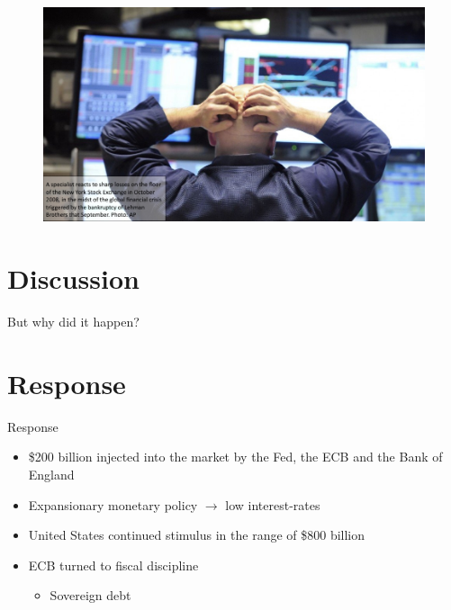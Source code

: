 \documentclass{beamer}
\begin{document}
\begin{frame}{}
\begin{figure}
    \centering
    \includegraphics[width=\textwidth]{../img/crash.JPG}
\end{figure}
\end{frame}{}

\section{Discussion}

\begin{frame}{}
\centering
\alert{\Large{But why did it happen?}}
\end{frame}{}

\section{Response}

\begin{frame}{Response}
\begin{itemize}
    \item \$200 billion injected into the market by the Fed, the ECB and the Bank of England\pause %
    \item Expansionary monetary policy $\rightarrow$ low interest-rates\pause
    \item United States continued stimulus in the range of \$800 billion \pause
    \item ECB turned to fiscal discipline\pause
    \begin{itemize}
        \item Sovereign debt
    \end{itemize}{}
\end{itemize}{}
\end{frame}
\end{document}
